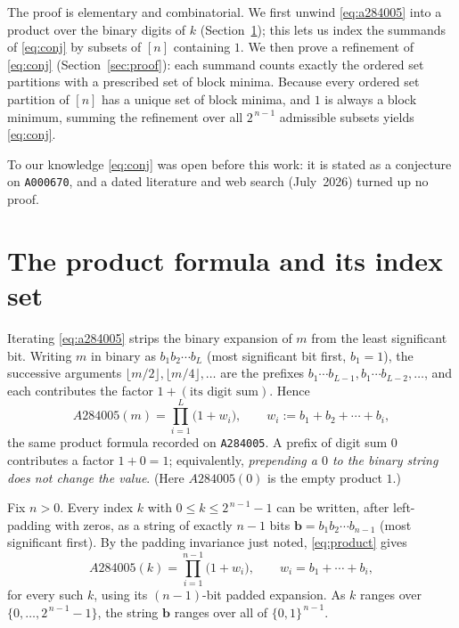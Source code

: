 \documentclass[11pt]{article}
\theoremstyle{definition}
\theoremstyle{remark}
\newcommand{\bit}{\mathbf{b}}
\begin{document}
The proof is elementary and combinatorial. We first unwind \eqref{eq:a284005}
into a product over the binary digits of $k$ (Section~\ref{sec:setup}); this
lets us index the summands of \eqref{eq:conj} by subsets of $[n]$ containing
$1$. We then prove a refinement of \eqref{eq:conj} (Section~\ref{sec:proof}):
each summand counts exactly the ordered set partitions with a prescribed set of
block minima. Because every ordered set partition of $[n]$ has a unique set of
block minima, and $1$ is always a block minimum, summing the refinement over all
$2^{\,n-1}$ admissible subsets yields \eqref{eq:conj}.

To our knowledge \eqref{eq:conj} was open before this work: it is stated as a
conjecture on \texttt{A000670}, and a dated literature and web search
(July~2026) turned up no proof.

\section{The product formula and its index set}\label{sec:setup}

Iterating \eqref{eq:a284005} strips the binary expansion of $m$ from the least
significant bit. Writing $m$ in binary as $b_1b_2\cdots b_L$ (most significant
bit first, $b_1=1$), the successive arguments $\lfloor m/2\rfloor,
\lfloor m/4\rfloor,\dots$ are the prefixes $b_1\cdots b_{L-1}, b_1\cdots
b_{L-2},\dots$, and each contributes the factor $1+(\text{its digit sum})$.
Hence
\begin{equation}\label{eq:product}
  A284005(m)=\prod_{i=1}^{L}\bigl(1+w_i\bigr),\qquad
  w_i:=b_1+b_2+\cdots+b_i,
\end{equation}
the same product formula recorded on \texttt{A284005}. A prefix of digit sum
$0$ contributes a factor $1+0=1$; equivalently, \emph{prepending a $0$ to the
binary string does not change the value}. (Here $A284005(0)$ is the empty
product $1$.)

Fix $n>0$. Every index $k$ with $0\le k\le 2^{\,n-1}-1$ can be written, after
left-padding with zeros, as a string of exactly $n-1$ bits
$\bit=b_1b_2\cdots b_{n-1}$ (most significant first). By the padding invariance
just noted, \eqref{eq:product} gives
\begin{equation}\label{eq:kproduct}
  A284005(k)=\prod_{i=1}^{n-1}\bigl(1+w_i\bigr),
  \qquad w_i=b_1+\cdots+b_i,
\end{equation}
for every such $k$, using its $(n-1)$-bit padded expansion. As $k$ ranges over
$\{0,\dots,2^{\,n-1}-1\}$, the string $\bit$ ranges over all of
$\{0,1\}^{\,n-1}$.
\end{document}
